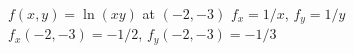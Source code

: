 {$f(x,y) = \ln(xy)$ at $(-2,-3)$
}
{$f_x=1/x$, $f_y=1/y$\\
$f_x(-2,-3) = -1/2$, $f_y(-2,-3) = -1/3$
}